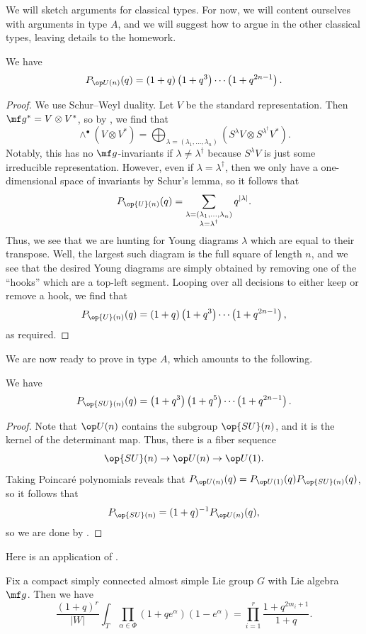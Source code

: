 \documentclass[../notes.tex]{subfiles}
\begin{document}
We will sketch arguments for classical types. For now, we will content ourselves with arguments in type $A$, and we will suggest how to argue in the other classical types, leaving details to the homework.
\begin{proposition} \label{prop:poincare-un}
	We have
	\[P_{\op U(n)}(q)=(1+q)\left(1+q^3\right)\cdots\left(1+q^{2n-1}\right).\]
\end{proposition}
\begin{proof}
	We use Schur--Weyl duality. Let $V$ be the standard representation. Then $\mf g^*=V\otimes V^*$, so by , we find that
	\[\land^\bullet(V\otimes V^*)=\bigoplus_{\lambda=(\lambda_1,\ldots,\lambda_n)}\left(S^\lambda V\otimes S^{\lambda^\dagger}V^*\right).\]
	Notably, this has no $\mf g$-invariants if $\lambda\ne\lambda^\dagger$ because $S^\lambda V$ is just some irreducible representation. However, even if $\lambda=\lambda^\dagger$, then we only have a one-dimensional space of invariants by Schur's lemma, so it follows that
	\[P_{\op{U}(n)}(q)=\sum_{\substack{\lambda=(\lambda_1,\ldots,\lambda_n)\\\lambda=\lambda^\dagger}}q^{\left|\lambda\right|}.\]
	Thus, we see that we are hunting for Young diagrams $\lambda$ which are equal to their transpose. Well, the largest such diagram is the full square of length $n$, and we see that the desired Young diagrams are simply obtained by removing one of the ``hooks'' which are a top-left segment. Looping over all decisions to either keep or remove a hook, we find that
	\[P_{\op{U}(n)}(q)=(1+q)\left(1+q^3\right)\cdots\left(1+q^{2n-1}\right),\]
	as required.
\end{proof}
We are now ready to prove  in type $A$, which amounts to the following.
\begin{corollary}
	We have
	\[P_{\op{SU}(n)}(q)=\left(1+q^3\right)\left(1+q^5\right)\cdots\left(1+q^{2n-1}\right).\]
\end{corollary}
\begin{proof}
	Note that $\op U(n)$ contains the subgroup $\op{SU}(n)$, and it is the kernel of the determinant map. Thus, there is a fiber sequence
	\[\op{SU}(n)\to\op U(n)\to\op U(1).\]
	Taking Poincar\'e polynomials reveals that $P_{\op U(n)}(q)=P_{\op U(1)}(q)P_{\op{SU}(n)}(q)$, so it follows that
	\[P_{\op{SU}(n)}=(1+q)^{-1}P_{\op U(n)}(q),\]
	so we are done by .
\end{proof}
Here is an application of .
\begin{theorem}
	Fix a compact simply connected almost simple Lie group $G$ with Lie algebra $\mf g$. Then we have
	\[\frac{(1+q)^r}{\left|W\right|}\int_T\prod_{\alpha\in\Phi}(1+qe^\alpha)(1-e^\alpha)=\prod_{i=1}^r\frac{1+q^{2m_i+1}}{1+q}.\]
\end{theorem}
\end{document}
